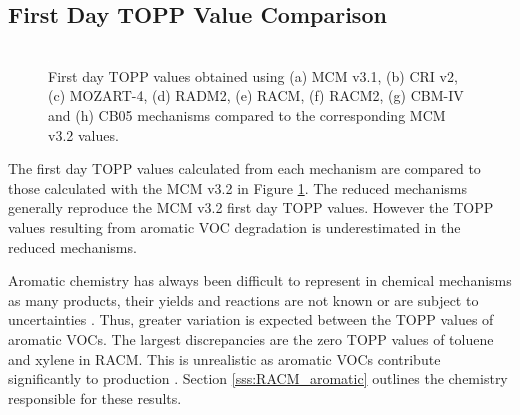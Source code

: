 
\subsection{First Day TOPP Value Comparison} \label{ss:day1} %

\begin{figure}
    \begin{center}
        \includegraphics[width=\textwidth]{img/first_day_values}
    \end{center}
    \caption{First day TOPP values obtained using (a) MCM v3.1, (b) CRI v2, (c) MOZART-4, (d) RADM2, (e) RACM, (f) RACM2, (g) CBM-IV and (h) CB05 mechanisms compared to the corresponding MCM v3.2 values.}
    \label{f:first_day}
\end{figure}

The first day TOPP values calculated from each mechanism are compared to those calculated with the MCM v3.{2} in Figure \ref{f:first_day}. 
The reduced mechanisms generally reproduce the MCM v3.2 first day TOPP values. 
However the TOPP values resulting from aromatic VOC degradation is underestimated in the reduced mechanisms.

Aromatic chemistry has always been difficult to represent in chemical mechanisms as many products, their yields and reactions are not known or are subject to uncertainties \citep{Vereecken:2012}. 
Thus, greater variation is expected between the TOPP values of aromatic VOCs. 
The largest discrepancies are the zero TOPP values of toluene and xylene in RACM. 
This is unrealistic as aromatic VOCs contribute significantly to  production \citep{Derwent:1998}. 
Section \ref{sss:RACM_aromatic} outlines the chemistry responsible for these results.

